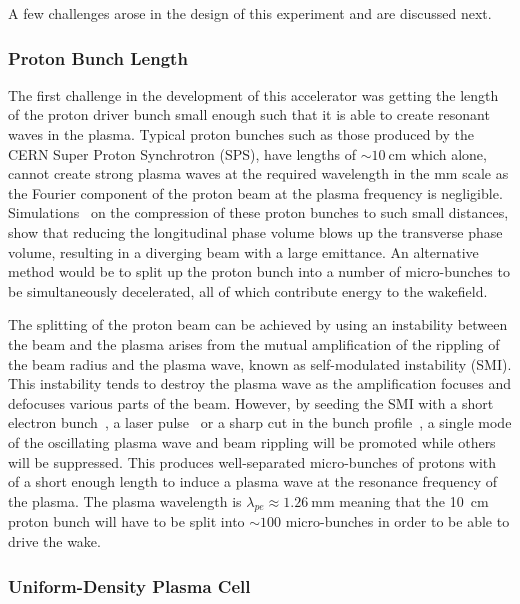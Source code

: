 A few challenges arose in the design of this experiment and are discussed next.


\subsubsection{Proton Bunch Length}

The first challenge in the development of this accelerator was getting the
length of the proton driver bunch small enough such that it is able to create
resonant waves in the plasma. Typical proton bunches such as those produced by
the CERN Super Proton Synchrotron (SPS), have lengths of \(\sim
\SI{10}{\centi\meter}\) which alone, cannot create strong plasma waves at the
required wavelength in the \si{\milli\meter} scale as the Fourier component of
the proton beam at the plasma frequency is negligible.
Simulations~\cite{kumar2010self} on the compression of these proton bunches to
such small distances, show that
reducing the longitudinal phase volume blows up the transverse phase volume,
resulting in a diverging beam with a large emittance. %
An alternative method would be to split up the proton bunch into a number of
micro-bunches to be simultaneously decelerated, all of which contribute energy
to the wakefield.

The splitting of the proton beam can be achieved by using an instability
between the beam and the plasma arises from the mutual
amplification of the rippling of the beam radius and the plasma wave, known as
self-modulated instability (SMI). This
instability tends to destroy the plasma wave as the amplification focuses and
defocuses various parts of the beam. 
However, by seeding the SMI with a short electron bunch~\cite{lotov2013natural},
a laser pulse~\cite{siemon2013laser} or a sharp cut in the bunch
profile~\cite{kumar2010self}, a single mode of the oscillating plasma wave and
beam rippling will be promoted while others will be suppressed. This produces
well-separated micro-bunches of protons with of a short enough length to induce
a plasma wave at the resonance frequency of the plasma.  The plasma wavelength
is \(\lambda_{pe} \approx \SI{1.26}{\milli\meter}\) meaning that the
\SI{10}{\centi\meter} proton bunch will have to be split into \(\sim 100\)
micro-bunches in order to be able to drive the wake. 


\subsubsection{Uniform-Density Plasma Cell}

